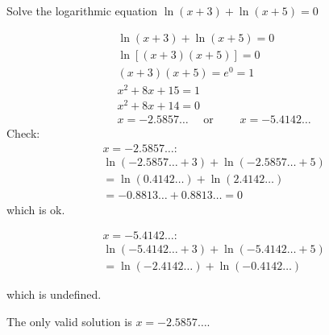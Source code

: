 \begin{example} Solve the logarithmic equation $\ln (x+3)+\ln (x+5)=0$

\begin{solution}
    \[
\begin{aligned}
& \ln (x+3)+\ln (x+5)=0 \\
& \ln [(x+3)(x+5)]=0 \\
& (x+3)(x+5)=e^0=1 \\
& x^2+8 x+15=1 \\
& x^2+8 x+14=0 \\
& x=-2.5857 \ldots \quad \text { or } \qquad x=-5.4142 \ldots
\end{aligned}
\]
Check:
\[
\begin{aligned}
& x=-2.5857 \ldots: \\
& \ln (-2.5857 \ldots+3)+\ln (-2.5857 \ldots+5) \\
& =\ln (0.4142 \ldots)+\ln (2.4142 \ldots) \\
& =-0.8813 \ldots+0.8813 \ldots=0
\end{aligned}
\]
which is ok.

\[
\begin{aligned}
& x=-5.4142 \ldots: \\
& \ln (-5.4142 \ldots+3)+\ln (-5.4142 \ldots+5) \\
& =\ln (-2.4142 \ldots)+\ln (-0.4142 \ldots)
\end{aligned}
\]

which is undefined.

The only valid solution is $x=-2.5857 \ldots$.
\end{solution}
    
\end{example}


